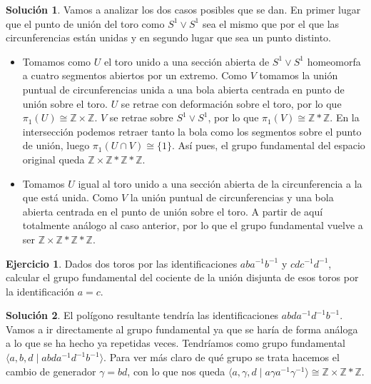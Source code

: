 \documentclass{article}
\theoremstyle{plain}
\theoremstyle{definition}
\newtheorem{exercise}{Ejercicio}
\newtheorem*{sol*}{Solución}
\newcommand{\Z}{\mathbb{Z}}
\begin{document}
\begin{sol*}
Vamos a analizar los dos casos posibles que se dan. En primer lugar que el punto de unión del toro como $S^1\vee S^1$ sea el mismo que por el que las circunferencias están unidas y en segundo lugar que sea un punto distinto.
\begin{itemize}
\item Tomamos como $U$ el toro unido a una sección abierta de $S^1\vee S^1$ homeomorfa a cuatro segmentos abiertos por un extremo. Como $V$ tomamos la unión puntual de circunferencias unida a una bola abierta centrada en punto de unión sobre el toro. $U$ se retrae con deformación sobre el toro, por lo que $\pi_1(U)\cong\Z\times\Z$. $V$ se retrae sobre $S^1\vee S^1$, por lo que $\pi_1(V)\cong\Z*\Z$. En la intersección podemos retraer tanto la bola como los segmentos sobre el punto de unión, luego $\pi_1(U\cap V)\cong\{1\}$. Así pues, el grupo fundamental del espacio original queda $\Z\times\Z*\Z*\Z$. 
\item Tomamos $U$ igual al toro unido a una sección abierta de la circunferencia a la que está unida. Como $V$ la unión puntual de circunferencias y una bola abierta centrada en el punto de unión sobre el toro. A partir de aquí totalmente análogo al caso anterior, por lo que el grupo fundamental vuelve a ser $\Z\times\Z*\Z*\Z$.
\end{itemize}
\end{sol*}

\newpage

\begin{exercise}

Dados dos toros por las identificaciones $aba^{-1}b^{-1}$ y $cdc^{-1}d^{-1}$, calcular el grupo fundamental del cociente de la uni\'on disjunta de esos toros por la identificaci\'on $a=c$.

\end{exercise}
\begin{sol*}
El polígono resultante tendría las identificaciones $abda^{-1}d^{-1}b^{-1}$. Vamos a ir directamente al grupo fundamental ya que se haría de forma análoga a lo que se ha hecho ya repetidas veces. Tendríamos como grupo fundamental $\langle a,b,d\mid abda^{-1}d^{-1}b^{-1}\rangle$. Para ver más claro de qué grupo se trata hacemos el cambio de generador $\gamma=bd$, con lo que nos queda $\langle a,\gamma, d\mid a\gamma a^{-1}\gamma^{-1}\rangle\cong\Z\times\Z*\Z$.
\end{sol*}

\newpage
\end{document}
